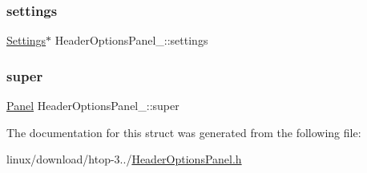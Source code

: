 \subsubsection{\texorpdfstring{settings}{settings}}
{\footnotesize\ttfamily \hyperlink{Settings_8h_ad97e5960b63f21c02bf5e0e43c0ef002}{Settings}$\ast$ Header\+Options\+Panel\+\_\+\+::settings}

\mbox{\label{structHeaderOptionsPanel___adadc83d631ce69103cb1cfea7f9ff239}} 
\subsubsection{\texorpdfstring{super}{super}}
{\footnotesize\ttfamily \hyperlink{Panel_8h_a034d4c16521db412dc7a1e8536d16fae}{Panel} Header\+Options\+Panel\+\_\+\+::super}



The documentation for this struct was generated from the following file\+:\begin{DoxyCompactItemize}
\item 
linux/download/htop-\/3../\hyperlink{HeaderOptionsPanel_8h}{Header\+Options\+Panel.\+h}\end{DoxyCompactItemize}
